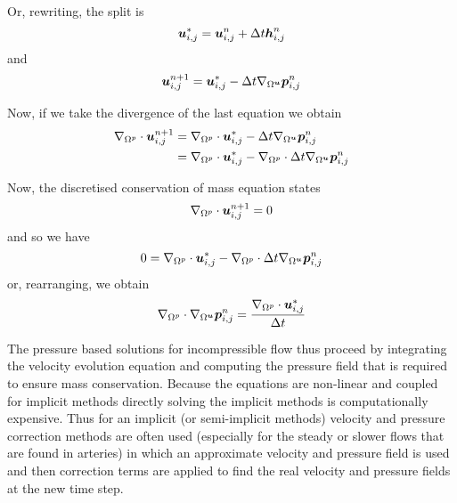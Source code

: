Or, rewriting, the split is
\begin{equation}
  \boldsymbol{u}^{*}_{i,j}=\boldsymbol{u}^{n}_{i,j}+\Delta t\boldsymbol{h}^{n}_{i,j}
\end{equation}
and
\begin{equation}
  \vectr{u}^{n+1}_{i,j}=\vectr{u}^{*}_{i,j}-\Delta t\gradient{\Omega^{\vectr{u}}}{\vectr{p}^{n}_{i,j}}
\end{equation}

Now, if we take the divergence of the last equation we obtain
\begin{equation}
  \begin{split}
    \divergence{\Omega^{p}}{\vectr{u}^{n+1}_{i,j}}
    &=\divergence{\Omega^{p}}{\vectr{u}^{*}_{i,j}-\Delta
      t\gradient{\Omega^{\vectr{u}}}{\vectr{p}^{n}_{i,j}}}\\
    &=\divergence{\Omega^{p}}{\vectr{u}^{*}_{i,j}}-\divergence{\Omega^{p}}{\Delta
      t\gradient{\Omega^{\vectr{u}}}{\vectr{p}^{n}_{i,j}}}
  \end{split}
\end{equation}

Now, the discretised conservation of mass equation states
\begin{equation}
  \divergence{\Omega^{p}}{\vectr{u}^{n+1}_{i,j}}=0
\end{equation}
and so we have
\begin{equation}
  0=\divergence{\Omega^{p}}{\vectr{u}^{*}_{i,j}}-\divergence{\Omega^{p}}{\Delta
      t\gradient{\Omega^{\vectr{u}}}{\vectr{p}^{n}_{i,j}}}
\end{equation}
or, rearranging, we obtain
\begin{equation}
  \divergence{\Omega^{p}}{\gradient{\Omega^{\vectr{u}}}{\vectr{p}^{n}_{i,j}}}=\dfrac{\divergence{\Omega^{p}}{\vectr{u}^{*}_{i,j}}}{\Delta
    t}
\end{equation}
  
The pressure based solutions for incompressible flow thus proceed by
integrating the velocity evolution equation and computing the pressure field
that is required to ensure mass conservation. Because the equations are
non-linear and coupled for implicit methods directly solving the implicit
methods is computationally expensive. Thus for an implicit (or semi-implicit
methods) velocity and pressure correction methods are often used (especially
for the steady or slower flows that are found in arteries) in which an
approximate velocity and pressure field is used and then correction terms are
applied to find the real velocity and pressure fields at the new time step.

